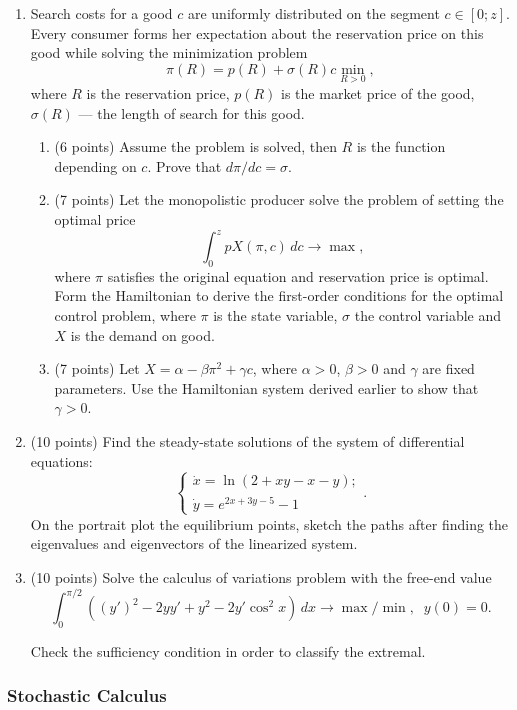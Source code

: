 \documentclass[12pt, a4paper]{article}
\begin{document}
\begin{enumerate}
  \item Search costs for a good $c$ are uniformly distributed on the segment $c\in [0;z]$. Every consumer forms her expectation about the reservation price on this good while solving the minimization problem
\[
\pi(R) = p(R) + \sigma(R) c \min_{R>0},
\]
where $R$ is the reservation price, $p(R)$ is the market price of the good, $\sigma(R)$ — the length of search for this good.
\begin{enumerate}
  \item (6 points) Assume the problem is solved, then $R$ is the function depending on $c$. Prove that $d\pi /dc = \sigma$.
  \item (7 points) Let the monopolistic producer solve the problem of setting the optimal price
  \[
  \int_0^z p X(\pi, c) \, dc \to \max,
  \]
   where $\pi$ satisfies the original equation and reservation price is optimal. Form the Hamiltonian to derive the first-order conditions for the optimal control problem, where $\pi$ is the state variable, $\sigma$ the control variable and $X$ is the demand on good.
   \item (7 points) Let $X=\alpha - \beta \pi^2 + \gamma c$, where $\alpha >0$, $\beta >0$ and $\gamma$ are fixed parameters. Use the Hamiltonian system derived earlier to show that $\gamma>0$.

\end{enumerate}

\item  (10 points)
Find the steady-state solutions of the system of differential equations:
\[
\begin{cases}
\dot x = \ln (2 + xy -x -y);\\
\dot y = e^{2x+3y-5}-1
\end{cases}.
\]
On the portrait plot the equilibrium points, sketch the paths after finding the eigenvalues and eigenvectors of the linearized system.

\item (10 points)
Solve the calculus of variations problem with the free-end value
\[
\int_0^{\pi/2}((y')^2 -2yy'+y^2 - 2y'\cos^2 x) \, dx \to \max/\min, \;\;y(0)=0.
\]

Check the sufficiency condition in order to classify the extremal.
\end{enumerate}

\subsubsection*{Stochastic Calculus}
\end{document}
